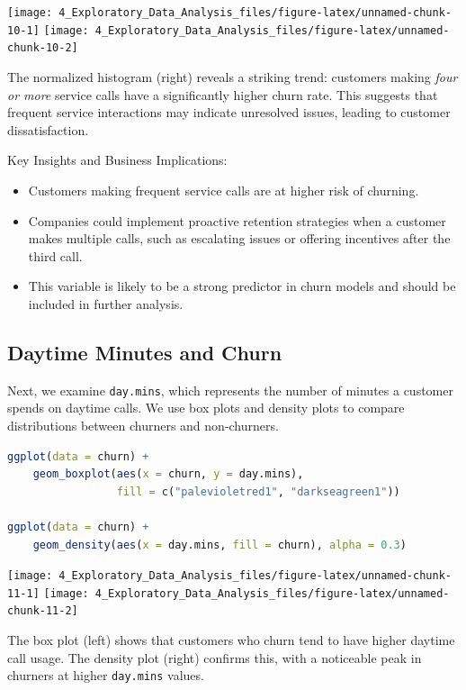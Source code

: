 \documentclass[
  11pt,
]{book}
\newcommand{\passthrough}[1]{#1}
\providecommand{\tightlist}{%
  \setlength{\itemsep}{0pt}\setlength{\parskip}{0pt}}
\theoremstyle{definition}
\theoremstyle{definition}
\theoremstyle{definition}
\theoremstyle{definition}
\theoremstyle{remark}
\begin{document}
\texttt{[image: 4\_Exploratory\_Data\_Analysis\_files/figure-latex/unnamed-chunk-10-1]} \texttt{[image: 4\_Exploratory\_Data\_Analysis\_files/figure-latex/unnamed-chunk-10-2]}

The normalized histogram (right) reveals a striking trend: customers making \emph{four or more} service calls have a significantly higher churn rate. This suggests that frequent service interactions may indicate unresolved issues, leading to customer dissatisfaction.

Key Insights and Business Implications:

\begin{itemize}
\tightlist
\item
  Customers making frequent service calls are at higher risk of churning.\\
\item
  Companies could implement proactive retention strategies when a customer makes multiple calls, such as escalating issues or offering incentives after the third call.\\
\item
  This variable is likely to be a strong predictor in churn models and should be included in further analysis.
\end{itemize}

\subsection*{Daytime Minutes and Churn}\label{daytime-minutes-and-churn}


Next, we examine \passthrough{\lstinline!day.mins!}, which represents the number of minutes a customer spends on daytime calls. We use box plots and density plots to compare distributions between churners and non-churners.

\begin{lstlisting}[language=R]
ggplot(data = churn) +
    geom_boxplot(aes(x = churn, y = day.mins), 
                 fill = c("palevioletred1", "darkseagreen1"))

ggplot(data = churn) +
    geom_density(aes(x = day.mins, fill = churn), alpha = 0.3)
\end{lstlisting}

\texttt{[image: 4\_Exploratory\_Data\_Analysis\_files/figure-latex/unnamed-chunk-11-1]} \texttt{[image: 4\_Exploratory\_Data\_Analysis\_files/figure-latex/unnamed-chunk-11-2]}

The box plot (left) shows that customers who churn tend to have higher daytime call usage. The density plot (right) confirms this, with a noticeable peak in churners at higher \passthrough{\lstinline!day.mins!} values.
\end{document}
